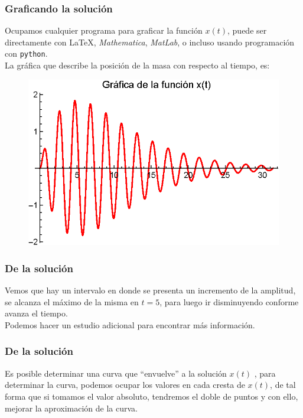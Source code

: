 \begin{frame}
\frametitle{Graficando la solución}
Ocupamos cualquier programa para graficar la función $x(t)$, puede ser directamente con \LaTeX, \emph{Mathematica}, \emph{MatLab}, o incluso usando programación con \texttt{python}.
\\
\bigskip
\pause
La gráfica que describe la posición de la masa con respecto al tiempo, es:
\end{frame}
\begin{frame}[plain]
\begin{figure}
    \centering
    \includegraphics[scale=1]{Imagenes/Ejemplo_Resonancia_01.eps}
\end{figure}
\end{frame}
\begin{frame}
\frametitle{De la solución}
Vemos que hay un intervalo en donde se presenta un incremento de la amplitud, se alcanza el máximo de la misma en $t = 5$, para luego ir disminuyendo conforme avanza el tiempo.
\\
\bigskip
\pause
Podemos hacer un estudio adicional para encontrar más información.
\end{frame}
\begin{frame}
\frametitle{De la solución}
Es posible determinar una curva que \enquote{envuelve} a la solución $x(t)$ , \pause para determinar la curva, podemos ocupar los valores en cada cresta de $x(t)$, de tal forma que si tomamos el valor absoluto, tendremos el doble de puntos y con ello, mejorar la aproximación de la curva.
\end{frame}
